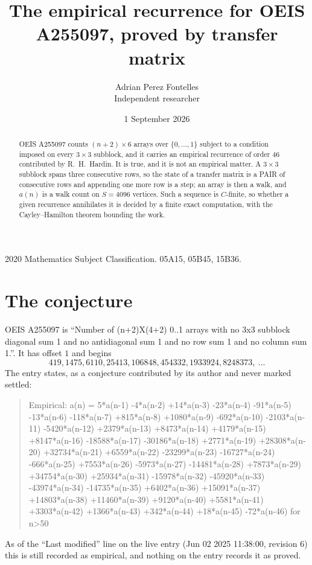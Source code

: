 \documentclass[11pt,a4paper]{article}
\title{The empirical recurrence for OEIS A255097, proved by transfer matrix}
\author{Adrian Perez Fontelles\\ \small Independent researcher}
\date{1 September 2026}
\theoremstyle{plain}
\theoremstyle{definition}
\begin{document}
\maketitle

\begin{abstract}
OEIS A255097 counts $(n+2)\times6$ arrays over $\{0,\dots,1\}$ subject to a condition imposed on
every $3\times3$ subblock, and it carries an empirical recurrence of order $46$
contributed by R.~H.~Hardin. It is true, and it is not an empirical matter. A $3\times3$
subblock spans three consecutive rows, so the state of a transfer matrix is a PAIR of
consecutive rows and appending one more row is a step; an array is then a walk, and
$a(n)$ is a walk count on $S=4096$ vertices. Such a sequence is $C$-finite, so whether a given
recurrence annihilates it is decided by a finite exact computation, with the Cayley--Hamilton
theorem bounding the work.
\end{abstract}

\noindent\small 2020 Mathematics Subject Classification. 05A15, 05B45, 15B36.\normalsize

\section{The conjecture}

OEIS A255097 is ``Number of (n+2)X(4+2) 0..1 arrays with no 3x3 subblock diagonal sum 1 and no antidiagonal sum 1 and no row sum 1 and no column sum 1.''. It has offset $1$ and begins
\[
419, 1475, 6110, 25413, 106848, 454332, 1933924, 8248373,\ \dots
\]
The entry states, as a conjecture contributed by its author and never marked settled:
\begin{quote}
Empirical: a(n) = 5*a(n-1) -4*a(n-2) +14*a(n-3) -23*a(n-4) -91*a(n-5) -13*a(n-6) -118*a(n-7) +815*a(n-8) +1080*a(n-9) -692*a(n-10) -2103*a(n-11) -5420*a(n-12) +2379*a(n-13) +8473*a(n-14) +4179*a(n-15) +8147*a(n-16) -18588*a(n-17) -30186*a(n-18) +2771*a(n-19) +28308*a(n-20) +32734*a(n-21) +6559*a(n-22) -23299*a(n-23) -16727*a(n-24) -666*a(n-25) +7553*a(n-26) -5973*a(n-27) -14481*a(n-28) +7873*a(n-29) +34754*a(n-30) +25934*a(n-31) -15978*a(n-32) -45920*a(n-33) -43974*a(n-34) -14735*a(n-35) +6402*a(n-36) +15091*a(n-37) +14803*a(n-38) +11460*a(n-39) +9120*a(n-40) +5581*a(n-41) +3303*a(n-42) +1366*a(n-43) +342*a(n-44) +18*a(n-45) -72*a(n-46) for n>50
\end{quote}
As of the ``Last modified'' line on the live entry (Jun 02 2025 11:38:00, revision 6) this is still
recorded as empirical, and nothing on the entry records it as proved.
\end{document}
